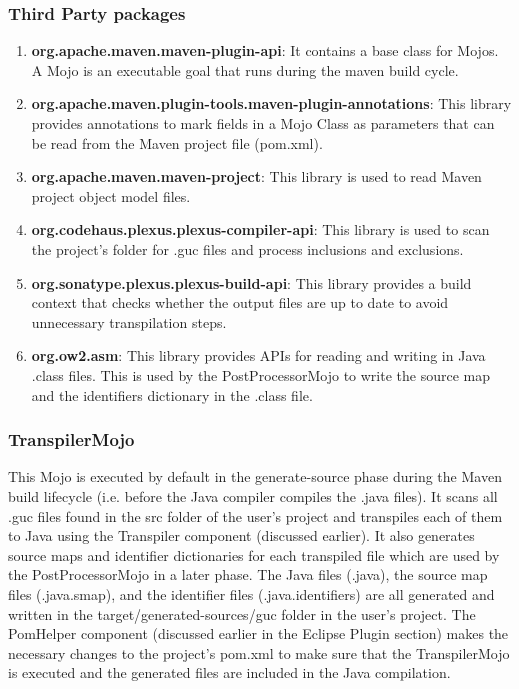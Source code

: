 \subsubsection{Third Party packages}
\begin{enumerate}
    \item \textbf{org.apache.maven.maven-plugin-api}: It contains a base class for Mojos. A Mojo is an executable goal that runs during the maven build cycle.
    \item \textbf{org.apache.maven.plugin-tools.maven-plugin-annotations}: This library provides annotations to mark fields in a Mojo Class as parameters that can be read from the Maven project file (pom.xml).
    \item \textbf{org.apache.maven.maven-project}: This library is used to read Maven project object model files.
    \item \textbf{org.codehaus.plexus.plexus-compiler-api}: This library is used to scan the project's folder for .guc files and process inclusions and exclusions.
    \item \textbf{org.sonatype.plexus.plexus-build-api}: This library provides a build context that checks whether the output files are up to date to avoid unnecessary transpilation steps.
    \item \textbf{org.ow2.asm}: This library provides APIs for reading and writing in Java .class files. This is used by the PostProcessorMojo to write the source map and the identifiers dictionary in the .class file.
\end{enumerate}
\subsubsection{TranspilerMojo}
This Mojo is executed by default in the generate-source phase during the Maven build lifecycle (i.e. before the Java compiler compiles the .java files). It scans all .guc files found in the src folder of the user's project and transpiles each of them to Java using the Transpiler component (discussed earlier). It also generates source maps and identifier dictionaries for each transpiled file which are used by the PostProcessorMojo in a later phase. The Java files (.java), the source map files (.java.smap), and the identifier files (.java.identifiers) are all generated and written in the target/generated-sources/guc folder in the user's project. The PomHelper component (discussed earlier in the Eclipse Plugin section) makes the necessary changes to the project's pom.xml to make sure that the TranspilerMojo is executed and the generated files are included in the Java compilation.
